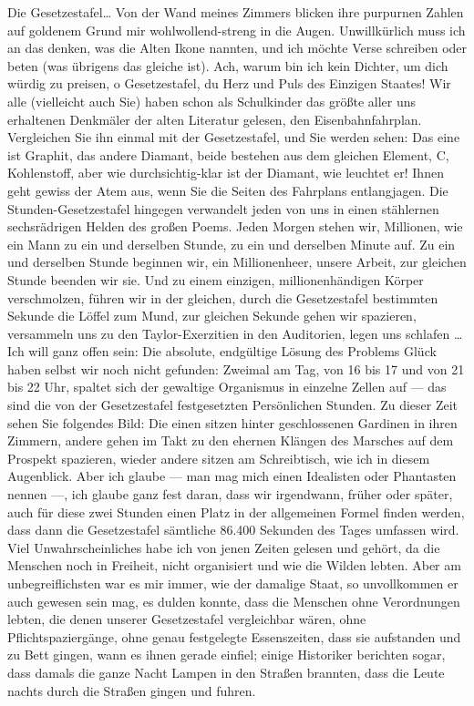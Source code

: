 Die Gesetzestafel\ldots{} Von der Wand meines Zimmers blicken ihre
purpurnen Zahlen auf goldenem Grund mir wohlwollend-streng in die
Augen. Unwillkürlich muss ich an das denken, was die Alten Ikone
nannten, und ich möchte Verse schreiben oder beten (was übrigens
das gleiche ist). Ach, warum bin ich kein Dichter, um dich würdig
zu preisen, o Gesetzestafel, du Herz und Puls des Einzigen Staates!
Wir alle (vielleicht auch Sie) haben schon als Schulkinder das
größte aller uns erhaltenen Denkmäler der alten Literatur gelesen,
den Eisenbahnfahrplan. Vergleichen Sie ihn einmal mit der
Gesetzestafel, und Sie werden sehen: Das eine ist Graphit, das
andere Diamant, beide bestehen aus dem gleichen Element, C,
Kohlenstoff, aber wie durchsichtig-klar ist der Diamant, wie
leuchtet er! Ihnen geht gewiss der Atem aus, wenn Sie die Seiten
des Fahrplans entlangjagen. Die Stunden-Gesetzestafel hingegen
verwandelt jeden von uns in einen stählernen sechsrädrigen Helden
des großen Poems. Jeden Morgen stehen wir, Millionen, wie ein Mann
zu ein und derselben Stunde, zu ein und derselben Minute auf. Zu
ein und derselben Stunde beginnen wir, ein Millionenheer, unsere
Arbeit, zur gleichen Stunde beenden wir sie. Und zu einem einzigen,
millionenhändigen Körper verschmolzen, führen wir in der gleichen,
durch die Gesetzestafel bestimmten Sekunde die Löffel zum Mund, zur
gleichen Sekunde gehen wir spazieren, versammeln uns zu den
Taylor-Exerzitien in den Auditorien, legen uns schlafen \ldots{} Ich
will ganz offen sein: Die absolute, endgültige Lösung
des Problems Glück haben selbst wir noch nicht gefunden: Zweimal am
Tag, von 16 bis 17 und von 21 bis 22 Uhr, spaltet sich der
gewaltige Organismus in einzelne Zellen auf — das sind die von der
Gesetzestafel festgesetzten Persönlichen Stunden. Zu dieser Zeit
sehen Sie folgendes Bild: Die einen sitzen hinter geschlossenen
Gardinen in ihren Zimmern, andere gehen im Takt zu den ehernen
Klängen des Marsches auf dem Prospekt spazieren, wieder andere
sitzen am Schreibtisch, wie ich in diesem Augenblick. Aber ich
glaube — man mag mich einen Idealisten oder Phantasten nennen —,
ich glaube ganz fest daran, dass wir irgendwann, früher oder
später, auch für diese zwei Stunden einen Platz in der allgemeinen
Formel finden werden, dass dann die Gesetzestafel sämtliche 86.400
Sekunden des Tages umfassen wird. Viel Unwahrscheinliches habe ich
von jenen Zeiten gelesen und gehört, da die Menschen noch in
Freiheit, nicht organisiert und wie die Wilden lebten. Aber am
unbegreiflichsten war es mir immer, wie der damalige Staat, so
unvollkommen er auch gewesen sein mag, es dulden konnte, dass die
Menschen ohne Verordnungen lebten, die denen unserer Gesetzestafel
vergleichbar wären, ohne Pflichtspaziergänge, ohne genau
festgelegte Essenszeiten, dass sie aufstanden und zu Bett gingen,
wann es ihnen gerade einfiel; einige Historiker berichten sogar,
dass damals die ganze Nacht Lampen in den Straßen brannten, dass
die Leute nachts durch die Straßen gingen und fuhren.

